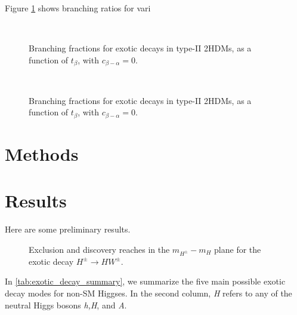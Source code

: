 Figure \ref{fig:exotic_higgs_brs} shows branching ratios for vari
\begin{figure}
  \centering
  \\
\caption{Branching fractions for exotic decays in type-II 2HDMs, as a function of $t_\beta$, with $c_{\beta-\alpha} = 0$.}
\label{fig:exotic_higgs_brs}
\end{figure}

\begin{figure}
  \\
\caption{Branching fractions for exotic decays in type-II 2HDMs, as a function of $t_\beta$, with $c_{\beta-\alpha} = 0$.}
\label{fig:honglei_results}
\end{figure}

\section{Methods}
\section{Results}
Here are some preliminary results.
\strictpagecheck
\begin{figure}
  \begin{sidecaption}{Exclusion and discovery reaches in the $m_{H^\pm}-m_{H}$ plane for the exotic decay $H^\pm\rightarrow HW^\pm$.}
    
\end{sidecaption}
\end{figure}

In \autoref{tab:exotic_decay_summary}, we summarize the five main possible exotic decay modes for non-SM Higgses. In the second column, \emph{H} refers to any of the neutral Higgs bosons \emph{h,H}, and \emph{A}.

